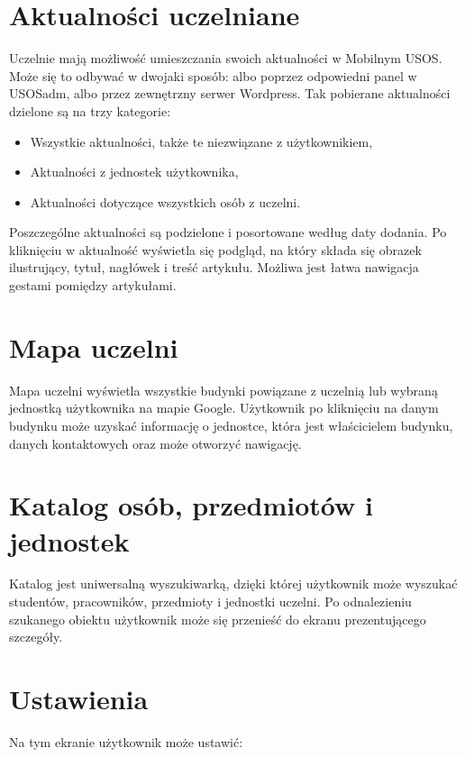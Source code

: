 \documentclass{pracamgr}
\begin{document}
\section{Aktualności uczelniane}

Uczelnie mają możliwość umieszczania swoich aktualności w Mobilnym USOS. Może się
to odbywać w dwojaki sposób: albo poprzez odpowiedni panel w USOSadm, albo przez
zewnętrzny serwer Wordpress. Tak pobierane aktualności dzielone są na trzy kategorie:

\begin{itemize}
	\item Wszystkie aktualności, także te niezwiązane z użytkownikiem,
	\item Aktualności z jednostek użytkownika,
	\item Aktualności dotyczące wszystkich osób z uczelni.
\end{itemize}

Poszczególne aktualności są podzielone i posortowane według daty dodania. Po
kliknięciu w aktualność wyświetla się podgląd, na który składa się obrazek ilustrujący,
tytuł, nagłówek i treść artykułu. Możliwa jest łatwa nawigacja gestami pomiędzy
artykułami.

\section{Mapa uczelni}

Mapa uczelni wyświetla wszystkie budynki powiązane z uczelnią lub wybraną jednostką
użytkownika na mapie Google. Użytkownik po kliknięciu na danym budynku może uzyskać
informację o jednostce, która jest właścicielem budynku, danych kontaktowych oraz
może otworzyć nawigację.

\section{Katalog osób, przedmiotów i jednostek}

Katalog jest uniwersalną wyszukiwarką, dzięki której użytkownik może wyszukać
studentów, pracowników, przedmioty i jednostki uczelni. Po odnalezieniu szukanego
obiektu użytkownik może się przenieść do ekranu prezentującego szczegóły.

\section{Ustawienia}

Na tym ekranie użytkownik może ustawić:
\end{document}
